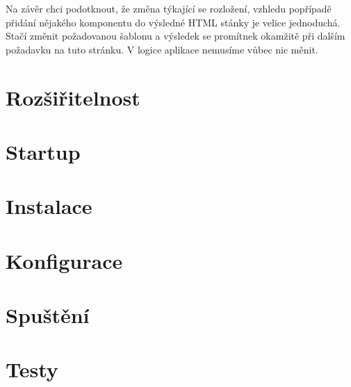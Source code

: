     Na závěr chci podotknout, že změna týkající se rozložení, vzhledu popřípadě přidání nějakého komponentu do výsledné HTML stánky je velice jednoduchá. Stačí změnit požadovanou šablonu a výsledek se promítnek okamžitě při dalším požadavku na tuto stránku. V logice aplikace nemusíme vůbec nic měnit.
\section{Rozšiřitelnost}


    
\section{Startup}
\section{Instalace}
\section{Konfigurace}
\section{Spuštění}
\section{Testy}

